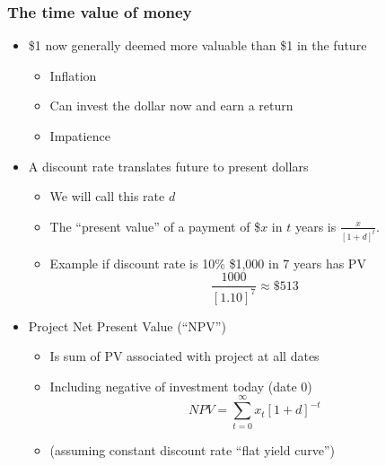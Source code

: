 \documentclass{beamer}
\begin{document}
\begin{frame}
	\frametitle{The time value of money}
	\begin{itemize}
		\item \$1 now generally deemed more valuable than \$1 in the future
			\begin{itemize}
				\item Inflation
				\item Can invest the dollar now and earn a return
				\item Impatience 
			\end{itemize}
		\item A discount rate translates future to present dollars
			\begin{itemize}
				\item We will call this rate $d$
				\item The ``present value'' of a payment of \$$x$ in $t$ years is $\frac{x}{\left[1+d\right]^t}$.
				\item Example if discount rate is 10\% \$1,000 in 7 years has PV
					$$\frac{1000}{\left[1.10\right]^7} \approx \$513$$
			\end{itemize}
		\item Project Net Present Value (``NPV'') 
			\begin{itemize}
				\item Is sum of PV associated with project at all dates
				\item Including negative of investment today (date 0)
					$$NPV = \sum_{t=0}^{\infty}x_{t}\left[1+d\right]^{-t}$$
				\item (assuming constant discount rate ``flat yield curve'')
			\end{itemize}
	\end{itemize}
\end{frame}
\end{document}
